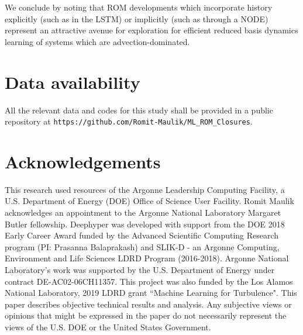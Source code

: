 \documentclass[preprint,12pt]{elsarticle}
\begin{document}
We conclude by noting that ROM developments which incorporate history explicitly (such as in the LSTM) or implicitly (such as through a NODE) represent an attractive avenue for exploration for efficient reduced basis dynamics learning of systems which are advection-dominated.

\section{Data availability}

All the relevant data and codes for this study shall be provided in a public repository at \texttt{https://github.com/Romit-Maulik/ML\_ROM\_Closures}.

\section{Acknowledgements}

This research used resources of the Argonne Leadership Computing Facility, a U.S. Department of Energy (DOE) Office of Science User Facility. Romit Maulik acknowledges an appointment to the Argonne National Laboratory Margaret Butler fellowship. Deephyper was developed with support from the DOE 2018 Early Career Award funded by the Advanced Scientific Computing Research program (PI: Prasanna Balaprakash) and SLIK-D - an Argonne Computing, Environment and Life Sciences LDRD Program (2016-2018). Argonne National Laboratory's work was supported by the U.S. Department of Energy under contract DE-AC02-06CH11357. This project was also funded by the Los Alamos National Laboratory, 2019 LDRD grant ``Machine Learning for Turbulence". This paper describes objective technical results and analysis. Any subjective views or opinions that might be expressed in the paper do not necessarily represent the views of the U.S. DOE or the United States Government.



\end{document}
